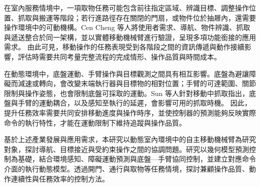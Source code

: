 在室內服務情境中，一項取物任務可能包含前往指定區域、辨識目標、調整操作位置、抓取與搬運等階段；若行進路徑存在關閉的門扇，或物件位於抽屜內，還需要操作環境中的可動機構。Cen Cheng 等人\cite{cencheng2026safe}將使用者需求、導航、物件辨識、抓取與遞送整合於同一架構，並以實體移動機械臂進行驗證，呈現多項功能銜接的應用需求。 由此可見，移動操作的任務表現受到各階段之間的資訊傳遞與動作接續影響，評估時需要共同考量完整流程的完成情形、操作品質與時間成本。

在動態環境中，底盤運動、手臂操作與目標觀測之間具有相互影響。底盤為避讓障礙而減速或轉向，會改變末端執行器與目標物的相對位置；手臂的可達範圍、關節限制與操作姿態，也會限制底盤可採取的運動。Sun 等人\cite{sun2026motion}針對移動中抓取指出，底盤與手臂的運動耦合，以及感知至執行的延遲，會影響可用的抓取時機。 因此，提升任務效率需要共同安排移動進度與操作時序，並使控制器的預測能夠反映實際命令的執行特性，才能在運動限制下維持追蹤與操作品質。

基於上述產業發展與應用需求，本研究以動態室內環境中的自主移動機械臂為研究對象，探討導航、目標接近與受約束操作之間的協調問題。研究以幾何模型預測控制為基礎，結合環境感知、障礙運動預測與底盤—手臂協同控制，並建立對應命令介面的執行動態模型。透過開門、通行與取物等任務情境，探討兼顧操作品質、動作連續性與任務效率的控制方法。
